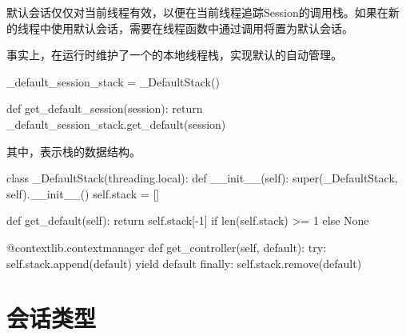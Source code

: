 \begin{content}
默认会话仅仅对当前线程有效，以便在当前线程追踪Session的调用栈。如果在新的线程中使用默认会话，需要在线程函数中通过调用将置为默认会话。

事实上，在运行时维护了一个的本地线程栈，实现默认的自动管理。

\begin{leftbar}
\begin{python}
_default_session_stack = _DefaultStack()

def get_default_session(session):
  return _default_session_stack.get_default(session)
\end{python}
\end{leftbar}

其中，表示栈的数据结构。

\begin{leftbar}
\begin{python}
class _DefaultStack(threading.local):
  def __init__(self):
    super(_DefaultStack, self).__init__()
    self.stack = []

  def get_default(self):
    return self.stack[-1] if len(self.stack) >= 1 else None

  @contextlib.contextmanager
  def get_controller(self, default):
    try:
      self.stack.append(default)
      yield default
    finally:
      self.stack.remove(default)
\end{python}
\end{leftbar}

\end{content}

\section{会话类型}


